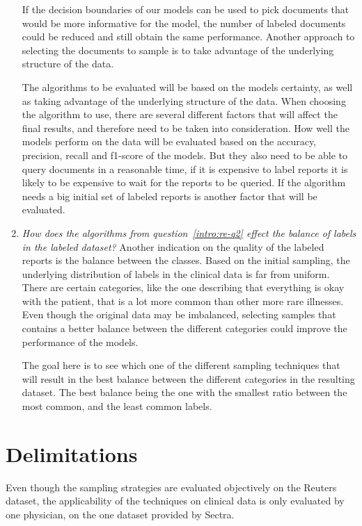 \begin{enumerate}
      If the decision boundaries of our models can be used to pick documents that would be more informative for the model, the number of labeled documents could be reduced and still obtain the same performance.
      Another approach to selecting the documents to sample is to take advantage of the underlying structure of the data.

      The algorithms to be evaluated will be based on the models certainty, as well as taking advantage of the underlying structure of the data.
      When choosing the algorithm to use, there are several different factors that will affect the final results, and therefore need to be taken into consideration.
      How well the models perform on the data will be evaluated based on the accuracy, precision, recall and f1-score of the models.
      But they also need to be able to query documents in a reasonable time, if it is expensive to label reports it is likely to be expensive to wait for the reports to be queried.
      If the algorithm needs a big initial set of labeled reports is another factor that will be evaluated.

  \item \label{intro:re-q3}
      \textit{How does the algorithms from question~\ref{intro:re-q2} effect the balance of labels in the labeled dataset?}
      Another indication on the quality of the labeled reports is the balance between the classes.
      Based on the initial sampling, the underlying distribution of labels in the clinical data is far from uniform.
      There are certain categories, like the one describing that everything is okay with the patient, that is a lot more common than other more rare illnesses.
      Even though the original data may be imbalanced, selecting samples that contains a better balance between the different categories could improve the performance of the models.

      The goal here is to see which one of the different sampling techniques that will result in the best balance between the different categories in the resulting dataset.
      The best balance being the one with the smallest ratio between the most common, and the least common labels.
\end{enumerate}

\section{Delimitations}
\label{sec:delimitations}

Even though the sampling strategies are evaluated objectively on the Reuters dataset, the applicability of the techniques on clinical data is only evaluated by one physician, on the one dataset provided by Sectra.


